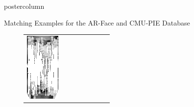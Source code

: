 \documentclass[final,hyperref={pdfpagelabels=false}]{beamer}
\begin{document}
\begin{frame}
\begin{columns}
\begin{column}{.49\textwidth}
\begin{beamercolorbox}[center,wd=\textwidth]{postercolumn}
\begin{minipage}[T]{.95\textwidth}
{\begin{block}{Matching Examples for the AR-Face and CMU-PIE Database}
\begin{figure}
\begin{tabular}{p{.09\linewidth} | p{.12\linewidth} | p{.12\linewidth} | p{.12\linewidth} || p{.12\linewidth} | p{.12\linewidth} | p{.12\linewidth} | p{.09\linewidth} }
                  \includegraphics[width=1.0\linewidth]{paper/bmvc09-surf/figures/matchings/arface-sift/grid-best_m-005-17.pgm--m-005-4}
                  &

\end{tabular}
\end{figure}
\end{block}}
\end{minipage}
\end{beamercolorbox}
\end{column}
\end{columns}
\end{frame}
\end{document}
